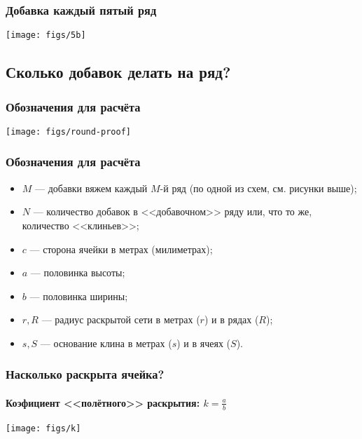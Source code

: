 \begin{frame}
    \frametitle{Добавка каждый \alert{пятый} ряд}

    \begin{center}
        \texttt{[image: figs/5b]}
    \end{center}
\end{frame}


\subsection{Сколько добавок делать на ряд?}

\begin{frame}
    \frametitle{Обозначения для расчёта}

    \begin{center}
        \texttt{[image: figs/round-proof]}
    \end{center}
\end{frame}

\begin{frame}
    \frametitle{Обозначения для расчёта}

	\begin{itemize}
		\item $M$ --- добавки вяжем каждый $M$-й ряд (по одной из схем, см. рисунки выше); 
		\item $N$ --- количество добавок в <<добавочном>> ряду или, что то же, количество <<клиньев>>; 
		\item $c$ --- сторона ячейки в метрах (милиметрах);
		\item $a$ --- половинка высоты; 
		\item $b$ --- половинка ширины; 
		\item $r,R$ --- радиус раскрытой сети в метрах ($r$) и в рядах ($R$); 
		\item $s,S$ --- основание клина в метрах ($s$) и в ячеях ($S$).
	\end{itemize}
\end{frame}

\begin{frame}
    \frametitle{Насколько раскрыта ячейка?}
    \framesubtitle{Коэфициент <<полётного>> раскрытия: $k=\frac{a}{b}$}

    \begin{center}
        \texttt{[image: figs/k]}
    \end{center}
\end{frame}

